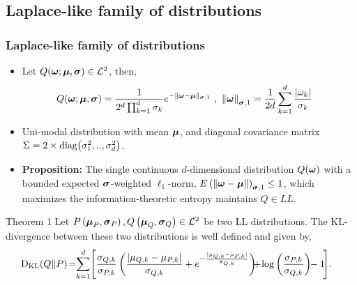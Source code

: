 \documentclass[mathserif]{beamer}
\begin{document}
\subsection{ Laplace-like family of distributions}
\begin{frame}
\frametitle{ Laplace-like family of distributions }
\begin{itemize}
\item Let $Q({\boldsymbol{\omega}};{\boldsymbol{\mu}},{\boldsymbol{\sigma}})\in{\mathcal{L}}^2$, then, 
\begin{align*}
Q({\boldsymbol{\omega}};{\boldsymbol{\mu}},{\boldsymbol{\sigma}})&= \frac{1}{2^d \prod_{k=1}^d \sigma_{k}}
e^{{-\| {\boldsymbol{\omega}}-{\boldsymbol{\mu}} \|_{{\boldsymbol{\sigma}},1}} } ~,~ {\| {\boldsymbol{\omega}} \|}_{{\boldsymbol{\sigma}},1} = \frac{1}{2d}\sum_{k=1}^{d}
\frac{ |\omega_{k}| }{\sigma_{k}}
\end{align*}

\item Uni-modal distribution with mean ${\boldsymbol{\mu}}$, and
 diagonal covariance matrix $\Sigma=2\times{\textrm{diag}}{\left({\sigma_1^2,..,\sigma_d^2}\right)}$.
\item \textbf{Proposition:}  The single continuous $d$-dimensional distribution $Q({\boldsymbol{\omega}})$ with  a bounded expected ${\boldsymbol{\sigma}}$-weighted $\ell_1$-norm, $E \left({\|
  {\boldsymbol{\omega}}-{\boldsymbol{\mu}} \|}\right)_{{\boldsymbol{\sigma}},1} \leq 1$,  which
maximizes the information-theoretic entropy maintains $Q\in LL$.
\end{itemize}
\begin{block}{Theorem 1} 
Let ${P}\left({{\boldsymbol{\mu}}_P,{\boldsymbol{\sigma}}_{P}}\right),{Q}\left({{\boldsymbol{\mu}}_Q,{\boldsymbol{\sigma}}_{Q}}\right)\in{\mathcal{L}}^2$ 
be two LL distributions. The KL- divergence between these two distributions is well defined and given by,
\begin{align*}
\KL(\cQ \Vert \cP)  \!=&\! \sum_{k=1}^{d}\!  \Bigg[    \frac{\sigmaqi{k}}{\sigmapi{k} }\paren{ \frac{ |\muqi{k}-\mupi{k}| }{\sigmaqi{k}}+e^{{-\frac{ |\muqi{k}-\mupi{k}| }{\sigmaqi{k}} } }  }  
\!\!\!+\!\log{ \paren{ \frac{\sigmapi{k}}{\sigmaqi{k}} } }\!\!-1\! \Bigg].
\end{align*}
\end{block}
\end{frame}
\end{document}
